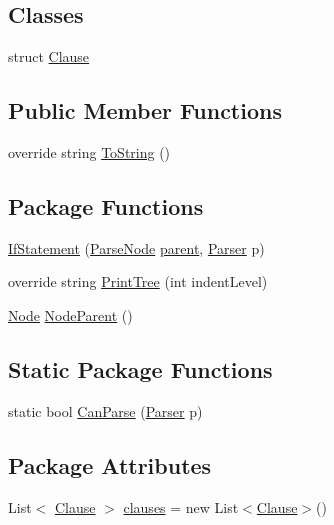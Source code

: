\subsection*{Classes}
\begin{DoxyCompactItemize}
\item 
struct \hyperlink{a00039}{Clause}
\end{DoxyCompactItemize}
\subsection*{Public Member Functions}
\begin{DoxyCompactItemize}
\item 
override string \hyperlink{a00077_a18c67cb16090d0889bb9d6c8c6c565f8}{To\-String} ()
\end{DoxyCompactItemize}
\subsection*{Package Functions}
\begin{DoxyCompactItemize}
\item 
\hyperlink{a00057_ae534078389e8663edf7660403acf3cbc}{If\-Statement} (\hyperlink{a00077}{Parse\-Node} \hyperlink{a00077_af313a82103fcc2ff5a177dbb06b92f7b}{parent}, \hyperlink{a00078}{Parser} p)
\item 
override string \hyperlink{a00057_a5494c1daef8e0f3ac3ab68f91db4f332}{Print\-Tree} (int indent\-Level)
\item 
\hyperlink{a00068}{Node} \hyperlink{a00077_a580e520a29444fc23ac3660cbe514a09}{Node\-Parent} ()
\end{DoxyCompactItemize}
\subsection*{Static Package Functions}
\begin{DoxyCompactItemize}
\item 
static bool \hyperlink{a00057_afd6b96e1a27872701c4e6832f17fc3ce}{Can\-Parse} (\hyperlink{a00078}{Parser} p)
\end{DoxyCompactItemize}
\subsection*{Package Attributes}
\begin{DoxyCompactItemize}
\item 
List$<$ \hyperlink{a00039}{Clause} $>$ \hyperlink{a00057_a679b1a21582c78ed06df36bccc9c3cbc}{clauses} = new List$<$\hyperlink{a00039}{Clause}$>$()
\end{DoxyCompactItemize}


